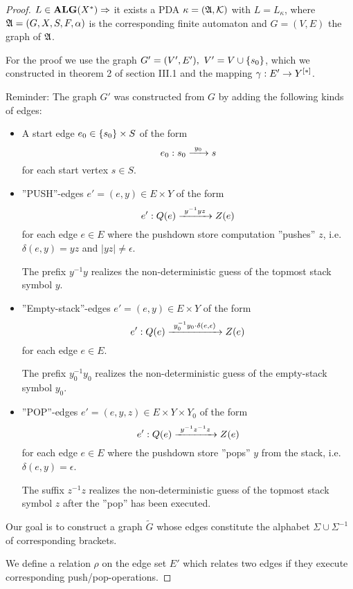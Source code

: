 \begin{proof}
$L\in \mbox{{\bf ALG}}(X^*) \Rightarrow$ it exists a PDA $\kappa=(\mbox{$\mathfrak{A}$},\mbox{$\mathcal{K}$})$ with
$L = L_\kappa$, where $\mbox{$\mathfrak{A}$}=(G, X, S, F, \alpha)$ is the corresponding finite
automaton and $G=(V, E)$ the graph of $\mbox{$\mathfrak{A}$}$.

For the proof we use the graph $G'=(V',E'),\ V' = V \cup \mbox{$\{s_0\}$}$, which we
constructed in theorem 2 of section III.1 and the mapping $\gamma: E' \to 
\mbox{${Y}^{[*]}$}$.

Reminder: The graph $G'$ was constructed from $G$ by adding the following kinds
of edges:
\begin{itemize}
  \item A start edge $e_0 \in \mbox{$\{s_0\}$} \times S$ of the form 
  \[e_0: s_0 \xrightarrow{\ {y_0}\ } s\] 
  for each start vertex $s \in S$.
  
  \item ''PUSH''-edges $e'=(e, y) \in E \times Y$ of the form
  \[e': Q(e) \xrightarrow{\ {y^{-1} y z}\ } Z(e)\]
  for each edge $e \in E$ where the pushdown store computation ''pushes'' $z$,
  i.e.\ $\delta(e, y) = yz$ and $|yz| \neq \epsilon$. 
  
  The prefix $y^{-1} y$ realizes the non-deterministic guess of the topmost
  stack symbol $y$.
  
  \item ''Empty-stack''-edges $e'=(e, y) \in E \times Y$ of the form
  \[e': Q(e) \xrightarrow{\ {y_0^{-1} y_0 \cdot \delta(e, \epsilon)}\ } Z(e)\]
  for each edge $e \in E$.
  
  The prefix $y_0^{-1} y_0$ realizes the non-deterministic guess of the
  empty-stack symbol $y_0$.
  
  \item ''POP''-edges $e'=(e, y, z) \in E \times Y \times Y_0$ of the form
  \[e': Q(e) \xrightarrow{\ {y^{-1} z^{-1} z}\ } Z(e)\]
  for each edge $e \in E$ where the pushdown store ''pops'' $y$ from the stack,
  i.e.\ $\delta(e, y) = \epsilon$.
  
  The suffix $z^{-1} z$ realizes the non-deterministic guess of the topmost
  stack symbol $z$ after the ''pop'' has been executed.
\end{itemize}

Our goal is to construct a graph $\tilde{G}$ whose edges constitute the alphabet
$\Sigma \cup \Sigma^{-1}$ of corresponding brackets.

We define a relation $\rho$ on the edge set $E'$ which relates two edges if they
execute corresponding push/pop-operations.


\end{proof}
